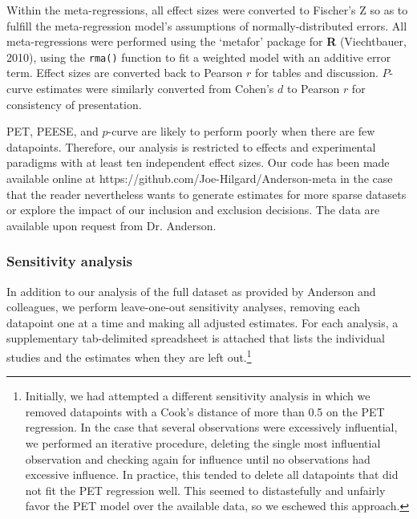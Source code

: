 \documentclass[man]{apa6}
\begin{document}
Within the meta-regressions, all effect sizes were converted to Fischer's Z so as to fulfill the meta-regression model's assumptions of normally-distributed errors. All meta-regressions were performed using the `metafor' package for {\bf R} (Viechtbauer, 2010), using the {\tt rma()} function to fit a weighted model with an additive error term. Effect sizes are converted back to Pearson $r$ for tables and discussion. 
$P$-curve estimates were similarly converted from Cohen's $d$ to Pearson $r$ for consistency of presentation.
\nocite{Viechtbauer:2010} %

PET, PEESE, and $p$-curve are likely to perform poorly when there are few datapoints. Therefore, our analysis is restricted to effects and experimental paradigms with at least ten independent effect sizes. %
Our code has been made available online at https://github.com/Joe-Hilgard/Anderson-meta in the case that the reader nevertheless wants to generate estimates for more sparse datasets or explore the impact of our inclusion and exclusion decisions. The data are available upon request from Dr. Anderson. %

\subsubsection{Sensitivity analysis}
In addition to our analysis of the full dataset as provided by Anderson and colleagues, we perform leave-one-out sensitivity analyses, removing each datapoint one at a time and making all adjusted estimates. For each analysis, a supplementary tab-delimited spreadsheet is attached that lists the individual studies and the estimates when they are left out.\footnote{Initially, we had attempted a different sensitivity analysis in which we removed datapoints with a Cook's distance of more than 0.5 on the PET regression. In the case that several observations were excessively influential, we performed an iterative procedure, deleting the single most influential observation and checking again for influence until no observations had excessive influence. In practice, this tended to delete all datapoints that did not fit the PET regression well. This seemed to distastefully and unfairly favor the PET model over the available data, so we eschewed this approach.} %
\end{document}
